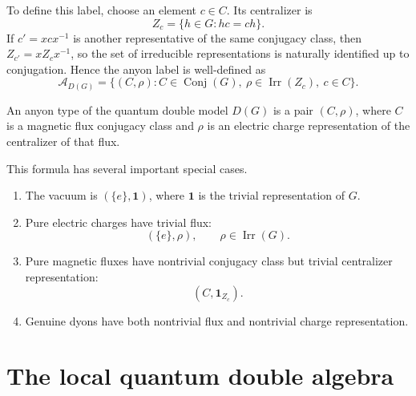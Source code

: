 To define this label, choose an element \(c\in C\).  Its centralizer is
\begin{equation}
\label{eq:centralizer-definition}
    Z_c
    =
    \{h\in G:hc=ch\} .
\end{equation}
If \(c' = xcx^{-1}\) is another representative of the same conjugacy class, then
\(Z_{c'}=xZ_cx^{-1}\), so the set of irreducible representations is naturally
identified up to conjugation.  Hence the anyon label is well-defined as
\begin{equation}
\label{eq:anyon-label-set-dg}
    \mathcal{A}_{D(G)}
    =
    \{(C,\rho): C\in\operatorname{Conj}(G),\
    \rho\in\operatorname{Irr}(Z_c),\ c\in C\} .
\end{equation}

\begin{definition}
An anyon type of the quantum double model \(D(G)\) is a pair \((C,\rho)\), where
\(C\) is a magnetic flux conjugacy class and \(\rho\) is an electric charge
representation of the centralizer of that flux.
\end{definition}

This formula has several important special cases.
\begin{enumerate}[label=(\roman*)]
    \item The vacuum is \((\{e\},\mathbf{1})\), where \(\mathbf{1}\) is the
    trivial representation of \(G\).
    \item Pure electric charges have trivial flux:
    \begin{equation}
    \label{eq:pure-electric-labels}
        (\{e\},\rho),
        \qquad
        \rho\in\operatorname{Irr}(G).
    \end{equation}
    \item Pure magnetic fluxes have nontrivial conjugacy class but trivial
    centralizer representation:
    \begin{equation}
    \label{eq:pure-magnetic-labels}
        (C,\mathbf{1}_{Z_c}) .
    \end{equation}
    \item Genuine dyons have both nontrivial flux and nontrivial charge
    representation.
\end{enumerate}

\section{The local quantum double algebra}
\label{sec:local-quantum-double-algebra}

